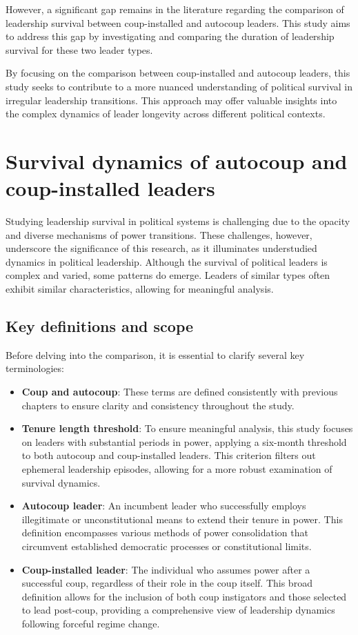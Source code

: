 \documentclass[
  12pt,
]{report}
\begin{document}
However, a significant gap remains in the literature regarding the
comparison of leadership survival between coup-installed and autocoup
leaders. This study aims to address this gap by investigating and
comparing the duration of leadership survival for these two leader
types.

By focusing on the comparison between coup-installed and autocoup
leaders, this study seeks to contribute to a more nuanced understanding
of political survival in irregular leadership transitions. This approach
may offer valuable insights into the complex dynamics of leader
longevity across different political contexts.

\section{Survival dynamics of autocoup and coup-installed
leaders}\label{survival-dynamics-of-autocoup-and-coup-installed-leaders}

Studying leadership survival in political systems is challenging due to
the opacity and diverse mechanisms of power transitions. These
challenges, however, underscore the significance of this research, as it
illuminates understudied dynamics in political leadership. Although the
survival of political leaders is complex and varied, some patterns do
emerge. Leaders of similar types often exhibit similar characteristics,
allowing for meaningful analysis.

\subsection{Key definitions and scope}\label{key-definitions-and-scope}

Before delving into the comparison, it is essential to clarify several
key terminologies:

\begin{itemize}
\item
  \textbf{Coup and autocoup}: These terms are defined consistently with
  previous chapters to ensure clarity and consistency throughout the
  study.
\item
  \textbf{Tenure length threshold}: To ensure meaningful analysis, this
  study focuses on leaders with substantial periods in power, applying a
  six-month threshold to both autocoup and coup-installed leaders. This
  criterion filters out ephemeral leadership episodes, allowing for a
  more robust examination of survival dynamics.
\item
  \textbf{Autocoup leader}: An incumbent leader who successfully employs
  illegitimate or unconstitutional means to extend their tenure in
  power. This definition encompasses various methods of power
  consolidation that circumvent established democratic processes or
  constitutional limits.
\item
  \textbf{Coup-installed leader}: The individual who assumes power after
  a successful coup, regardless of their role in the coup itself. This
  broad definition allows for the inclusion of both coup instigators and
  those selected to lead post-coup, providing a comprehensive view of
  leadership dynamics following forceful regime change.
\end{itemize}
\end{document}
